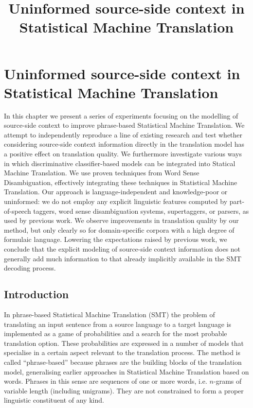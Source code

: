 \pgfplotsset{compat=newest}



\chapter{Uninformed source-side context in Statistical Machine Translation}
\title{Uninformed source-side context in Statistical Machine Translation}
\label{chap:contextinsmt}
\label{chap:sourcecontextinsmt}




In this chapter we present a series of experiments focusing on the modelling of
source-side context to improve phrase-based Statistical Machine Translation. We
attempt to independently reproduce a line of existing research and test whether
considering source-side context information directly in the translation model
has a positive effect on translation quality.  We furthermore investigate
various ways in which discriminative classifier-based models can be integrated
into Statical Machine Translation.  We use proven techniques from Word Sense
Disambiguation, effectively integrating these techniques in Statistical Machine
Translation. Our approach is language-independent and knowledge-poor or
uninformed: we do not employ any explicit linguistic features computed by
part-of-speech taggers, word sense disambiguation systems, supertaggers, or
parsers, as used by previous work. We observe improvements in translation
quality by our method, but only clearly so for domain-specific corpora with a
high degree of formulaic language. Lowering the expectations raised by previous
work, we conclude that the explicit modeling of source-side context information
does not generally add much information to that already implicitly available in
the SMT decoding process.  


\section{Introduction}

In phrase-based Statistical Machine Translation (SMT) the problem of
translating an input sentence from a source language to a target language is
implemented as a game of probabilities and a search for the most probable
translation option.  These probabilities are expressed in a number of models
that specialise in a certain aspect relevant to the translation process. The
method is called ``phrase-based'' because phrases are the building blocks of
the translation model, generalising earlier approaches in
Statistical Machine Translation based on words.  Phrases in this
sense are sequences of one or more words, i.e. $n$-grams of variable
length (including unigrams). They are not constrained to form a
proper linguistic constituent of any kind.

